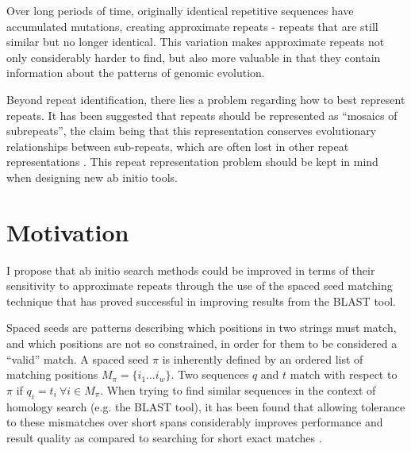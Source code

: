\documentclass[12pt]{article}
\begin{document}
Over long periods of time, originally identical repetitive sequences have accumulated mutations, creating approximate repeats - repeats that are still similar but no longer identical. 
This variation makes approximate repeats not only considerably harder to find, but also more valuable in that they contain information about the patterns of genomic evolution.



Beyond repeat identification, there lies a problem regarding how to best represent repeats. 
It has been suggested that repeats should be
represented as ``mosaics of subrepeats'', the claim being that this representation conserves evolutionary relationships between sub-repeats, which are often lost in other repeat representations \cite{pevzner2004de-novo}. This repeat representation problem should be kept in mind when designing new ab initio tools.

\section*{Motivation}
I propose that ab initio search methods could be improved in terms of their sensitivity to approximate repeats through the use of the spaced seed matching technique that has proved successful in improving results from the BLAST tool.


Spaced seeds are patterns describing which positions in two strings  must match, and which positions are not so constrained, in order for them to be considered a ``valid'' match. 
A spaced seed $\pi$ is inherently defined by an ordered list of matching positions $M_{\pi} = \lbrace i_{1} \dotsc i_{w} \rbrace$. 
Two sequences $q$ and $t$ match with respect to $\pi$ if $q_{i} = t_{i} \ \forall i \in M_{\pi}$. 
When trying to find similar sequences in the context of homology search (e.g. the BLAST tool), it has been found that allowing tolerance to these mismatches over short spans considerably improves performance and result quality as compared to searching for short exact matches \cite{ma2002patternhunter}.
\end{document}
